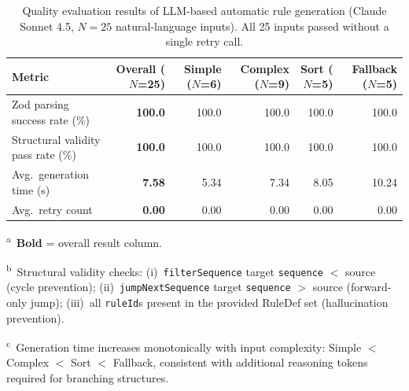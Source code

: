 %
\usepackage{booktabs}        %
\usepackage{multirow}        %
\usepackage{threeparttable}  %
\usepackage{array}           %
\usepackage{siunitx}         %


\begin{table}[htbp]
  \centering
  \caption{Quality evaluation results of LLM-based automatic rule generation
           (Claude Sonnet 4.5, $N=25$ natural-language inputs).
           All 25 inputs passed without a single retry call.}
  \label{tab:1}
  \small
  \begin{threeparttable}
    \begin{tabular}{lrrrrr}
      \toprule
      \textbf{Metric}
        & \textbf{Overall ($N$=25)}
        & \textbf{Simple ($N$=6)}
        & \textbf{Complex ($N$=9)}
        & \textbf{Sort ($N$=5)}
        & \textbf{Fallback ($N$=5)} \\
      \midrule
      Zod parsing success rate (\%)       & \textbf{100.0} & 100.0 & 100.0 & 100.0 & 100.0 \\
      Structural validity pass rate (\%)  & \textbf{100.0} & 100.0 & 100.0 & 100.0 & 100.0 \\
      Avg.\ generation time (s)           & \textbf{7.58}  &  5.34 &  7.34 &  8.05 & 10.24 \\
      Avg.\ retry count                   & \textbf{0.00}  &  0.00 &  0.00 &  0.00 &  0.00 \\
      \bottomrule
    \end{tabular}
    \begin{tablenotes}
      \footnotesize
      \item \textsuperscript{a}~\textbf{Bold} = overall result column.
      \item \textsuperscript{b}~Structural validity checks: (i)~\texttt{filterSequence} target
            \texttt{sequence} $<$ source (cycle prevention); (ii)~\texttt{jumpNextSequence}
            target \texttt{sequence} $>$ source (forward-only jump); (iii)~all
            \texttt{ruleId}s present in the provided RuleDef set (hallucination prevention).
      \item \textsuperscript{c}~Generation time increases monotonically with input complexity:
            Simple $<$ Complex $<$ Sort $<$ Fallback, consistent with additional reasoning
            tokens required for branching structures.
    \end{tablenotes}
  \end{threeparttable}
\end{table}


